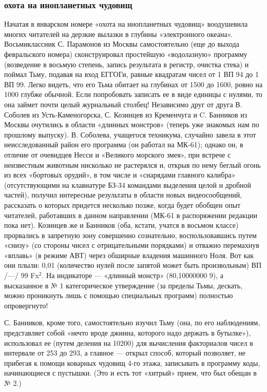 \documentclass[11pt,a4paper,oneside]{article}
\begin{document}
\subsubsection{охота на инопланетных чудовищ}
Начатая в январском номере «охота на инопланетных чудовищ» воодушевила многих читателей на дерзкие вылазки в глубины «электронного океана». Восьмиклассник С. Парамонов из Москвы самостоятельно (еще до выхода февральского номера) сконструировал простейшую «водолазную» программу (возведение в восьмую степень, запись результата в регистр, очистка стека) и поймал Тьму, подавая на вход ЕГГОГи, равные квадратам чисел от 1 ВП 94 до 1 ВП 99. Легко видеть, что его Тьма обитает на глубинах от 1500 до 1600, ровно на 1000 глубже обычной. Если попробовать записать ее в виде единицы с нулями, то она займет почти целый журнальный столбец! Независимо друг от друга В. Соболев из Усть-Каменогорска, С. Козинцев из Кременчуга и C. 	Банников из Москвы очутились в области «длинных монстров» (теперь уже знакомых нам по прошлому выпуску). В. Соболева, учащегося техникума, случайно завела в этот неисследованный район его программа (он работал на МК-61); однако он, в отличие от очевидцев Несси и «Великого морского змея», при встрече с неизвестным животным нисколько не растерялся и, открыв по нему беглый огонь из всех «бортовых орудий», в том числе и «снарядами главного калибра» (отсутствующими на клавиатуре БЗ-34 командами выделения целой и дробной частей), получил интересные результаты в области новых видеосообщений, рассказать о которых придется несколько позже, когда будет обобщен опыт читателей, работавших в данном направлении (МК-61 в распоряжении редакции пока нет). Козинцев же и Банников (оба, кстати, учатся в восьмом классе) прорвались в запретную зону совершенно сознательно, воспользовавшись путем «снизу» (со стороны чисел с отрицательными порядками) и отважно перемахнув «вплавь» (в режиме АВТ) через обширные владения машинного Ноля. Вот как они плыли: 0,01 (количество нулей после запятой может быть произвольным) ВП /—/ 99 Fx$^{2}$. На индикаторе — «длинный монстр» (80,10000000 9), а высказанное в № 1 категорическое утверждение (за пределы Тьмы, дескать, можно проникнуть лишь с помощью специальных программ) полностью опровергнуто!

С.	Банников, кроме того, самостоятельно изучил Тьму (она, по его наблюдениям, представляет собой «нечто вроде джинна, которого надо держать в бутылке»), использовал ее (путем деления на 10200) для вычисления факториалов чисел в интервале от 253 до 293, а главное — открыл способ, который позволяет, не прибегая к помощи коварных чудовищ 4-го этажа, записывать в программу коды, начинающиеся с пустышки. (Это и есть тот «хитрый» прием, что был обещан в № 2.)
\end{document}

